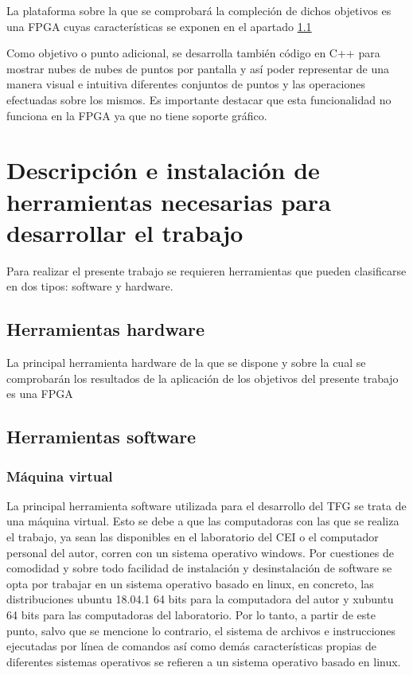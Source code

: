 La plataforma sobre la que se comprobará la compleción de dichos objetivos es una FPGA cuyas características se exponen en el apartado \ref{herraminetas_hardware}

Como objetivo o punto adicional, se desarrolla también código en C++ para mostrar nubes de nubes de puntos por pantalla y así poder representar de una manera visual e intuitiva diferentes conjuntos de puntos y las operaciones efectuadas sobre los mismos. Es importante destacar que esta funcionalidad no funciona en la FPGA ya que no tiene soporte gráfico.


\section{Descripción e instalación de herramientas necesarias para desarrollar el trabajo}
Para realizar el presente trabajo se requieren herramientas que pueden clasificarse en dos tipos: software y hardware.
\subsection{Herramientas hardware} \label{herraminetas_hardware}
La principal herramienta hardware de la que se dispone y sobre la cual se comprobarán los resultados de la aplicación de los objetivos del presente trabajo es una FPGA 
\subsection{Herramientas software}
\subsubsection{Máquina virtual}
La principal herramienta software utilizada para el desarrollo del TFG se trata de una máquina virtual. Esto se debe a que las computadoras con las que se realiza el trabajo, ya sean las disponibles en el laboratorio del CEI o el computador personal del autor, corren con un sistema operativo windows. Por cuestiones de comodidad y sobre todo facilidad de instalación y desinstalación de software se opta por trabajar en un sistema operativo basado en linux, en concreto, las distribuciones ubuntu 18.04.1 64 bits para la computadora del autor y xubuntu 64 bits para las computadoras del laboratorio. Por lo tanto, a partir de este punto, salvo que se mencione lo contrario, el sistema de archivos e instrucciones ejecutadas por línea de comandos así como demás características propias de diferentes sistemas operativos se refieren a un sistema operativo basado en linux.

